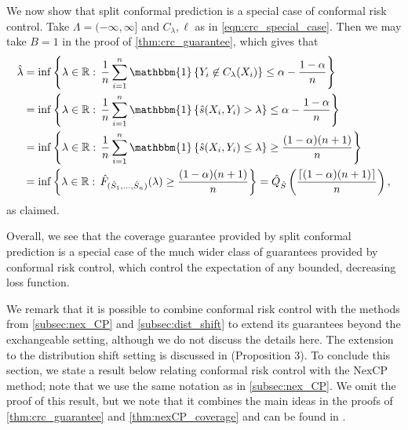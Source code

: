 \documentclass[11pt, titlepage]{article} %
\newcommand{\Ind}[1]{\mathbbm{1}\left\{ #1 \right\}}
\numberwithin{equation}{section}
\theoremstyle{definition}
\numberwithin{theorem}{section}
\numberwithin{lemma}{section}
\numberwithin{corollary}{section}
\numberwithin{proposition}{section}
\numberwithin{definition}{section}
\numberwithin{remark}{section}
\begin{document}
\noindent
We now show that split conformal prediction is a special case of conformal risk control. Take \(\Lambda = (-\infty, \infty]\) and \(C_\lambda, \ell\) as in \eqref{eqn:crc_special_case}. Then we may take \(B = 1\) in the proof of \cref{thm:crc_guarantee}, which gives that \begin{align*}
    \hat{\lambda} &= \inf \left\{ \lambda \in \mathbb{R}: \, \frac{1}{n} \sum_{i=1}^{n} \Ind{Y_i \not \in C_\lambda (X_i)} \leq \alpha - \frac{1-\alpha}{n} \right\} \\
    &= \inf \left\{ \lambda \in \mathbb{R}: \, \frac{1}{n} \sum_{i=1}^{n} \Ind{\hat{s}(X_i, Y_i) > \lambda} \leq \alpha - \frac{1-\alpha}{n} \right\} \\
    &= \inf \left\{ \lambda \in \mathbb{R}: \, \frac{1}{n} \sum_{i=1}^{n} \Ind{\hat{s}(X_i, Y_i) \leq \lambda} \geq \frac{(1-\alpha)(n+1)}{n} \right\} \\
    &= \inf \left\{ \lambda \in \mathbb{R}: \, \hat{F}_{(\hat{S}_1, \ldots, \hat{S}_n)}(\lambda) \geq \frac{(1-\alpha)(n+1)}{n} \right\} = \hat{Q}_{\hat{S}}\left( \frac{\lceil (1-\alpha)(n+1) \rceil}{n} \right),
\end{align*} as claimed. \vskip5pt

\noindent
Overall, we see that the coverage guarantee provided by split conformal prediction is a special case of the much wider class of guarantees provided by conformal risk control, which control the expectation of any bounded, decreasing loss function. \vskip5pt

\noindent
We remark that it is possible to combine conformal risk control with the methods from \cref{subsec:nex_CP} and \cref{subsec:dist_shift} to extend its guarantees beyond the exchangeable setting, although we do not discuss the details here. The extension to the distribution shift setting is discussed in \cite{angelopoulos2024riskcontrol} (Proposition 3). To conclude this section, we state a result below relating conformal risk control with the NexCP method; note that we use the same notation as in \cref{subsec:nex_CP}. We omit the proof of this result, but we note that it combines the main ideas in the proofs of \cref{thm:crc_guarantee} and \cref{thm:nexCP_coverage} and can be found in \cite{farinhas2024nonexchangeable}.
\end{document}
